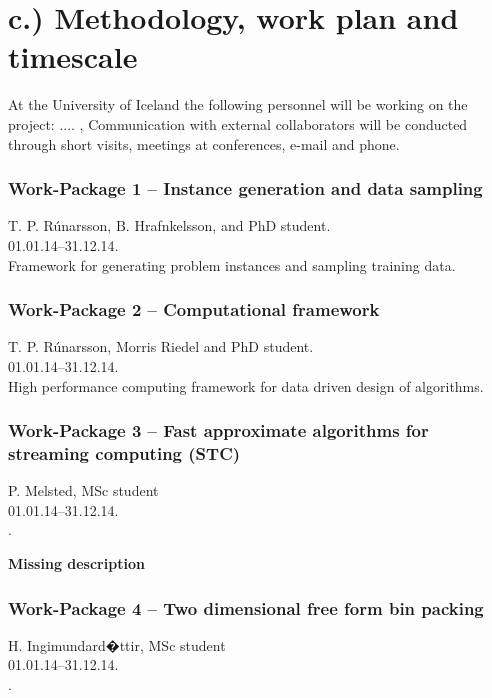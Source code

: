 \documentclass[12pt,a4paper]{article}
\begin{document}
\section*{\normalsize c.) Methodology, work plan and timescale}

At the University of Iceland the following personnel will be working on the project: .... , Communication with 
external collaborators will be conducted through short visits, meetings at 
conferences, e-mail and phone.

\subsubsection*{Work-Package 1 -- Instance generation and data sampling}
 T. P. R\'unarsson, B. Hrafnkelsson, and PhD student.\\
 01.01.14--31.12.14.\\
 Framework for generating problem instances and sampling training data.


\subsubsection*{Work-Package 2 -- Computational framework}

 T. P. R\'unarsson, Morris Riedel and PhD student.\\
 01.01.14--31.12.14.\\
 High performance computing framework for data driven design of algorithms.


\subsubsection*{Work-Package 3 -- Fast approximate algorithms for streaming computing (STC)}
 P. Melsted, MSc student\\
 01.01.14--31.12.14.\\
 .

{\bf Missing description}


\subsubsection*{Work-Package 4 -- Two dimensional free form bin packing}
 H. Ingimundard�ttir, MSc student\\
 01.01.14--31.12.14.\\
 .
\end{document}

